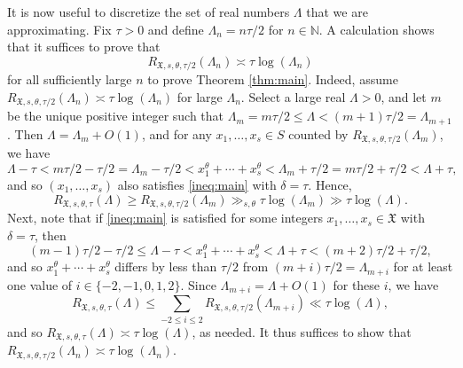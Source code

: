 \documentclass[11pt,reqno]{amsart}
\numberwithin{equation}{section}
\begin{document}
It is now useful to discretize the set of real numbers $\Lambda$ that we are approximating. Fix $\tau > 0$ and define $\Lambda_n = n\tau/2$ for $n \in \mathbb{N}$. A calculation shows that it suffices to prove that 
\[ R_{\mathfrak{X},s,\theta,\tau/2}(\Lambda_n) \asymp \tau \log(\Lambda_n) \]
for all sufficiently large $n$ to prove Theorem \ref{thm:main}. 
Indeed, assume $R_{\mathfrak{X},s,\theta,\tau/2}(\Lambda_n) \asymp \tau \log(\Lambda_n)$ for large $\Lambda_n$. Select a large real $\Lambda >0$, and let $m$ be the unique positive integer such that $\Lambda_m = m\tau/2 \leq \Lambda < (m+1)\tau/2 = \Lambda_{m+1}$. Then $\Lambda = \Lambda_m +O(1)$, and for any $x_1,\ldots,x_s \in S$ counted by $R_{\mathfrak{X},s,\theta,\tau/2}(\Lambda_m)$, we have 
\[ \Lambda-\tau < m\tau/2-\tau/2 = \Lambda_m-\tau/2 < x_1^{\theta}+\cdots+x_s^{\theta} <\Lambda_m+\tau/2= m\tau/2+\tau/2 < \Lambda+\tau,  \]
and so $(x_1,\ldots,x_s)$ also satisfies \eqref{ineq:main} with $\delta = \tau$. Hence, 
\[ R_{\mathfrak{X},s,\theta,\tau}(\Lambda) \geq R_{\mathfrak{X},s,\theta,\tau/2}(\Lambda_m) \gg_{s,\theta} \tau \log(\Lambda_m) \gg \tau\log(\Lambda). \]
Next, note that if \eqref{ineq:main} is satisfied for some integers $x_1, \ldots, x_s \in \mathfrak{X}$ with $\delta = \tau$, then 
\[ (m-1)\tau/2- \tau/2 \leq \Lambda-\tau < x_1^{\theta}+\cdots+x_s^{\theta} < \Lambda+\tau < (m+2)\tau/2+\tau/2,  \]
and so $x_1^{\theta}+\cdots+x_s^{\theta}$ differs by less than $\tau/2$ from $(m+i)\tau/2 = \Lambda_{m+i}$ for at least one value of $i \in \{-2,-1,0,1,2 \}$. Since $\Lambda_{m+i} = \Lambda+O(1)$ for these $i$, we have 
\[ R_{\mathfrak{X},s,\theta,\tau}(\Lambda) \leq \sum_{-2 \leq i \leq 2} R_{\mathfrak{X},s,\theta,\tau/2}(\Lambda_{m+i}) \ll \tau\log(\Lambda), \]
and so $R_{\mathfrak{X},s,\theta,\tau}(\Lambda) \asymp \tau \log(\Lambda)$, as needed. 
It thus suffices to show that $R_{\mathfrak{X},s,\theta,\tau/2}(\Lambda_n) \asymp \tau \log(\Lambda_n)$. 
\end{document}
